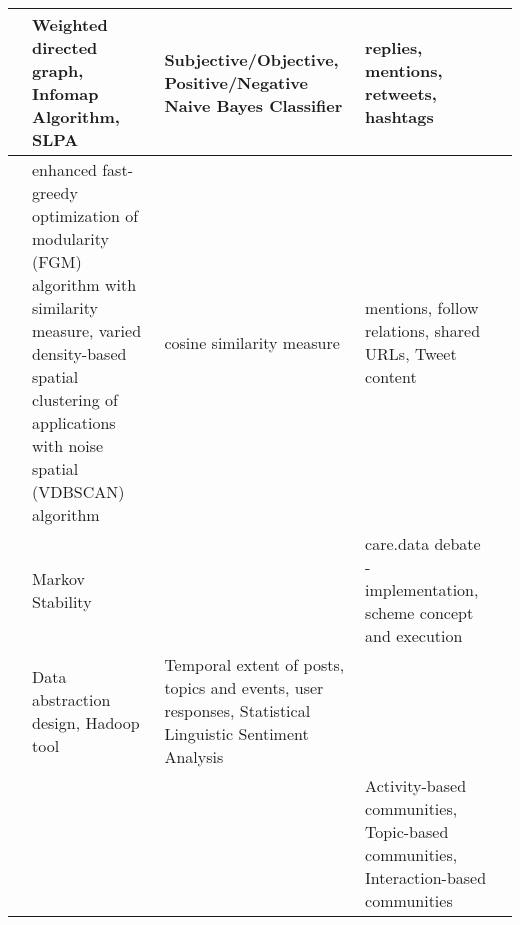 \begin{landscape}
\begin{longtable}{| p{} | p{} | p{} | p{} | p{} |}
		\hline
		\cite{Deitrick:2013} & Weighted directed graph, Infomap Algorithm, SLPA & Subjective/Objective, Positive/Negative Naive Bayes Classifier & replies, mentions, retweets, hashtags & \\
		\hline
		\cite{Bakillah:2014} & enhanced fast-greedy optimization of modularity (FGM) algorithm with similarity measure, varied density-based spatial clustering of applications with noise spatial (VDBSCAN) algorithm & cosine similarity measure & mentions, follow relations, shared URLs, Tweet content & \\
		\hline
		\cite{Amor:2015} & Markov Stability & & care.data debate - implementation, scheme concept and execution & \\
		\hline
		\cite{Cao:2015} & Data abstraction design, Hadoop tool & Temporal extent of posts, topics and events, user responses, Statistical Linguistic Sentiment Analysis & & \\
		\hline
		\cite{Darmon:2015} & & & Activity-based communities, Topic-based communities, Interaction-based communities & \\
		\hline
	\end{longtable}
\end{landscape}
